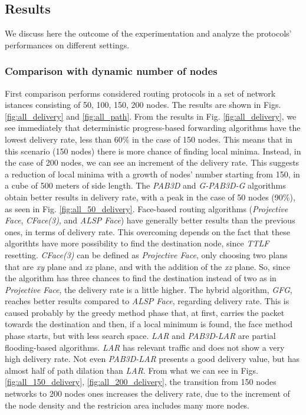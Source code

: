 \documentclass[journal,comsoc]{IEEEtran}
\begin{document}
\subsection{Results}
We discuss here the outcome of the experimentation and analyze the protocols' performances on different settings.

\subsubsection{Comparison with dynamic number of nodes}
First comparison performs considered routing protocols in a set of network istances consisting of 50, 100, 150, 200 nodes. The results are shown in Figs. \ref{fig:all_delivery} and \ref{fig:all_path}. From the results in Fig. \ref{fig:all_delivery}, we see immediately that deterministic progress-based forwarding algorithms have the lowest delivery rate, less than 60\% in the case of 150 nodes. This means that in this scenario (150 nodes) there is more chance of finding local minima. Instead, in the case of 200 nodes, we can see an increment of the delivery rate. This suggests a reduction of local minima with a growth of nodes' number starting from 150, in a cube of 500 meters of side length. The \emph{PAB3D} and \emph{G-PAB3D-G} algorithms obtain better results in delivery rate, with a peak in the case of 50 nodes (90\%), as seen in Fig. \ref{fig:all_50_delivery}. Face-based routing algorithms (\emph{Projective Face}, \emph{CFace(3)}, and \emph{ALSP Face}) have generally better results than the previous ones, in terms of delivery rate. This overcoming depends on the fact that these algorithts have more possibility to find the destination node, since \emph{TTLF} resetting. \emph{CFace(3)} can be defined as \emph{Projective Face}, only choosing two plans that are \emph{xy} plane and \emph{xz} plane, and with the addition of the \emph{xz} plane. So, since the algorithm has three chances to find the destination instead of two as in \emph{Projective Face}, the delivery rate is a little higher. The hybrid algorithm, \emph{GFG}, reaches better results compared to \emph{ALSP Face}, regarding delivery rate. This is caused probably by the greedy method phase that, at first, carries the packet towards the destination and then, if a local minimum is found, the face method phase starts, but with less search space. \emph{LAR} and \emph{PAB3D-LAR} are partial flooding-based algorithms. \emph{LAR} has relevant traffic and does not show a very high delivery rate. Not even \emph{PAB3D-LAR} presents a good delivery value, but has almost half of path dilation than \emph{LAR}. From what we can see in Figs. \ref{fig:all_150_delivery}, \ref{fig:all_200_delivery}, the transition from 150 nodes networks to 200 nodes ones increases the delivery rate, due to the increment of the node density and the restricion area includes many more nodes.
\end{document}
